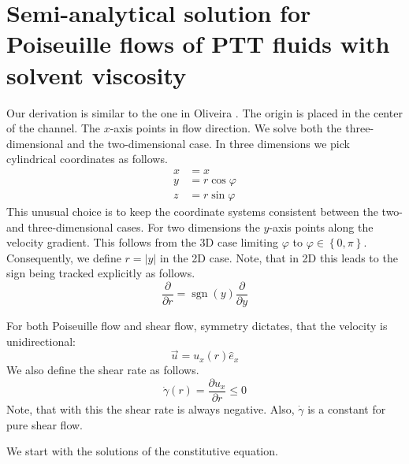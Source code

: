 \documentclass[a4paper,12pt]{scrartcl}
\newcommand{\abs}[1]{\lvert#1\rvert}
\DeclareMathOperator{\sgn}{sgn}
\begin{document}

\section{Semi-analytical solution for Poiseuille flows of PTT fluids with solvent viscosity}
\label{app:semianalyticalPoiseuille}
Our derivation is similar to the one in Oliveira \cite{oliveira1999}. The origin is placed in the center of the channel. The $x$-axis points in flow direction.
We solve both the three-dimensional and the two-dimensional case. In three dimensions we pick cylindrical coordinates as follows.
\begin{align}
	x &= x\\
	y &= r\cos\varphi\\
	z &= r\sin\varphi
\end{align}
This unusual choice is to keep the coordinate systems consistent between the two- and three-dimensional cases. For two dimensions the $y$-axis points along the velocity gradient. This follows from the 3D case limiting $\varphi$ to $\varphi\in\left\{0, \pi\right\}$. Consequently, we define $r = \abs{y}$ in the 2D case. Note, that in 2D this leads to the sign being tracked explicitly as follows.
\begin{equation}
	\frac{\partial}{\partial r} =  \sgn\left(y\right)\frac{\partial}{\partial y}
\end{equation}

For both Poiseuille flow and shear flow, symmetry dictates, that the velocity is unidirectional:
\begin{equation}
	\vec{u} = u_x\left(r\right)\hat{e}_x
\end{equation}
We also define the shear rate as follows.
\begin{equation}
\dot{\gamma}\left(r\right) = \frac{\partial u_x}{\partial r} \leq 0
\end{equation}
Note, that with this the shear rate is always negative. Also, $\dot{\gamma}$ is a constant for pure shear flow.

We start with the solutions of the constitutive equation.
\end{document}
